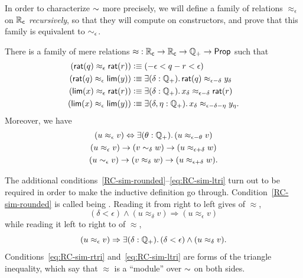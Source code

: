 In order to characterize $\mathord\sim$ more precisely, we will define a family of relations $\approx_\epsilon$ on $\mathbb{R}_\mathsf{c}$ \emph{recursively}, so that they will compute on constructors, and prove that this family is equivalent to $\sim_{\epsilon}$.

\begin{thm}\label{defn:RC-approx}
  There is a family of mere relations $\mathord\approx:\mathbb{R}_\mathsf{c}\to\mathbb{R}_\mathsf{c}\to\mathbb{Q}_{+}\to\mathsf{Prop}$ such that
  \begin{align}
    (\rcrat(q) \approx_\epsilon \rcrat(r))  &\defeq
    (-\epsilon < q - r < \epsilon)\label{eq:RCappx1}\\
    (\rcrat(q) \approx_\epsilon \rclim(y)) &\defeq
    \exis{\delta : \Qp} \rcrat(q) \approx_{\epsilon - \delta} y_\delta\label{eq:RCappx2}\\
    (\rclim(x) \approx_\epsilon \rcrat(r)) &\defeq
    \exis{\delta : \Qp} x_\delta \approx_{\epsilon - \delta} \rcrat(r)\label{eq:RCappx3}\\
    (\rclim(x) \approx_\epsilon \rclim(y)) &\defeq
    \exis{\delta, \eta : \Qp} x_\delta \approx_{\epsilon - \delta - \eta} y_\eta.\label{eq:RCappx4}
  \end{align}
  Moreover, we have
  \begin{gather}
    (u \approx_\epsilon v) \Leftrightarrow \exis{\theta:\Qp} (u \approx_{\epsilon-\theta} v) \label{RC-sim-rounded}\\
    (u \approx_\epsilon v) \to (v\close\delta w) \to (u\approx_{\epsilon+\delta} w)\label{eq:RC-sim-rtri}\\
    (u \close\epsilon v) \to (v\approx_\delta w) \to (u\approx_{\epsilon+\delta} w)\label{eq:RC-sim-ltri}.
  \end{gather}
\end{thm}

The additional conditions~\eqref{RC-sim-rounded}--\eqref{eq:RC-sim-ltri} turn out to be required in order to make the inductive definition go through.
Condition~\eqref{RC-sim-rounded} is called being .
%
%
Reading it from right to left gives  of $\approx$,
%
%
%
\begin{equation*}
  (\delta < \epsilon) \land (u \approx_\delta v) \Rightarrow (u \approx_\epsilon v)
\end{equation*}
%
while reading it left to right to  of $\approx$,
%
%
%
\begin{equation*}
  (u \approx_\epsilon v) \Rightarrow \exis{\delta : \Qp} (\delta < \epsilon) \land (u \approx_\delta v).
\end{equation*}
%
Conditions~\eqref{eq:RC-sim-rtri} and~\eqref{eq:RC-sim-ltri} are forms of the triangle inequality, which say that $\approx$ is a ``module'' over $\mathord\sim$ on both sides.

